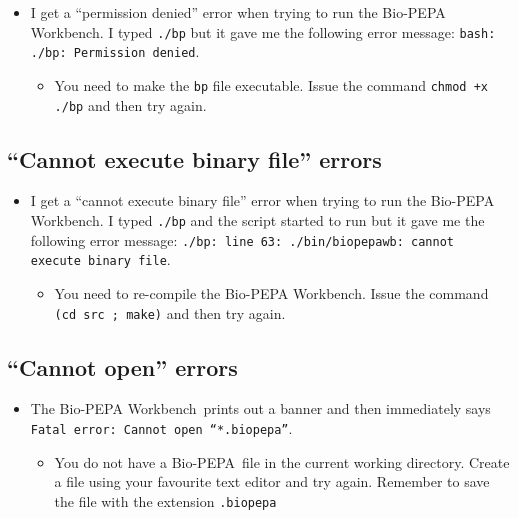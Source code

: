 \documentclass[11pt,a4paper]{article}
\newcommand{\BioPEPA}{Bio-PEPA}
\newcommand{\BPWB}{{\BioPEPA} Workbench}
\begin{document}
\begin{itemize}
\item I get a ``permission denied'' error when trying to run the \BPWB.
      I typed \texttt{./bp} but it gave me the following 
      error message: \texttt{bash: ./bp: Permission denied}.
      \begin{itemize}
      \item You need to make the \texttt{bp} file executable.  Issue
            the command \texttt{chmod +x ./bp} and then try again.
      \end{itemize}
\end{itemize}


\subsection{``Cannot execute binary file'' errors}

\begin{itemize}
\item I get a ``cannot execute binary file'' error when trying to run the \BPWB.
      I typed \texttt{./bp} and the script started to run but it gave me the following 
      error message: \texttt{./bp: line 63: ./bin/biopepawb: cannot execute binary file}.
      \begin{itemize}
      \item You need to re-compile the \BPWB.  Issue
            the command \texttt{(cd src ; make)} and then try again.
      \end{itemize}
\end{itemize}

\subsection{``Cannot open'' errors}

\begin{itemize}
\item The \BPWB\ prints out a banner and then immediately says
      \texttt{Fatal error: Cannot open ``*.biopepa''}.
      \begin{itemize}
      \item You do not have a \BioPEPA\ file in the current 
            working directory.  Create a file using your favourite
            text editor and try again.  Remember to save the file 
            with the extension \texttt{.biopepa}
      \end{itemize}
\end{itemize}
\end{document}
